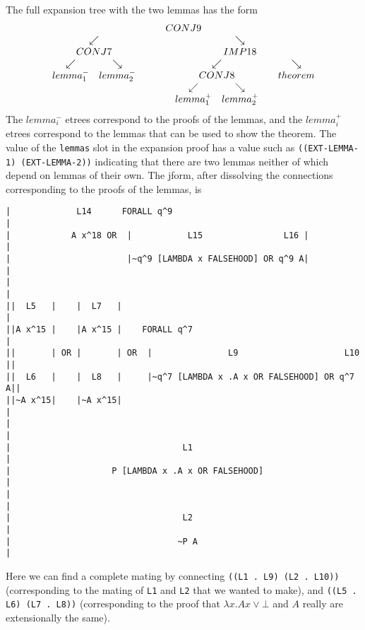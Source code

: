 The full expansion tree with the two lemmas has the form
$$
{{\begin{array}[t]{c}CONJ9 \\ \begin{array}[t]{cc} \swarrow & \searrow \\ {{\begin{array}[t]{c}CONJ7 \\ \begin{array}[t]{cc} \swarrow & \searrow \\ lemma_1^- & lemma_2^- \end{array}\end{array}}} & {{\begin{array}[t]{c}IMP18 \\ \begin{array}[t]{cc} \swarrow & \searrow \\ {{\begin{array}[t]{c}CONJ8 \\ \begin{array}[t]{cc} \swarrow & \searrow \\ lemma_1^+ & lemma_2^+ \end{array}\end{array}}} & theorem \end{array}\end{array}}} \end{array}\end{array}}}
$$
The $lemma_i^-$ etrees correspond to the proofs of the lemmas,
and the $lemma_i^+$ etrees correspond to the lemmas that can be
used to show the theorem.
The value of the \verb+lemmas+ slot in the expansion proof has a value
such as \verb+((EXT-LEMMA-1) (EXT-LEMMA-2))+
indicating that there are two lemmas neither of which
depend on lemmas of their own.
The jform, after dissolving the connections corresponding to
the proofs of the lemmas, is
\begin{verbatim}
|             L14      FORALL q^9                                       |
|            A x^18 OR  |           L15                L16 |            |
|                       |~q^9 [LAMBDA x FALSEHOOD] OR q^9 A|            |
|                                                                       |
||  L5   |    |  L7   |                                                 |
||A x^15 |    |A x^15 |    FORALL q^7                                   |
||       | OR |       | OR  |               L9                     L10 ||
||  L6   |    |  L8   |     |~q^7 [LAMBDA x .A x OR FALSEHOOD] OR q^7 A||
||~A x^15|    |~A x^15|                                                 |
|                                                                       |
|                                  L1                                   |
|                    P [LAMBDA x .A x OR FALSEHOOD]                     |
|                                                                       |
|                                  L2                                   |
|                                 ~P A                                  |
\end{verbatim}
Here we can find a complete mating by connecting
\verb+((L1 . L9) (L2 . L10))+ (corresponding to the mating
of \verb+L1+ and \verb+L2+ that we wanted to make),
and \verb+((L5 . L6) (L7 . L8))+ (corresponding to the proof
that $\lambda x . A x \lor \bot$ and $A$ really are extensionally
the same).

